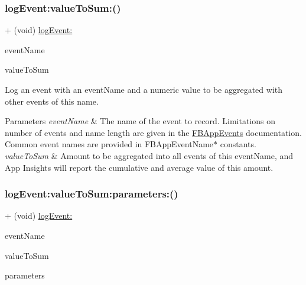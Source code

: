 \subsubsection{\texorpdfstring{log\+Event\+:value\+To\+Sum\+:()}{logEvent:valueToSum:()}\hspace{0.1cm}{\footnotesize\ttfamily [5/5]}}
{\footnotesize\ttfamily + (void) \hyperlink{interfaceFBAppEvents_a816373dd50bcf7381bf8194758ef8441}{log\+Event\+:} \begin{DoxyParamCaption}\item[{(N\+S\+String $\ast$)}]{event\+Name }\item[{valueToSum:(double)}]{value\+To\+Sum }\end{DoxyParamCaption}}

Log an event with an event\+Name and a numeric value to be aggregated with other events of this name.


\begin{DoxyParams}{Parameters}
{\em event\+Name} & The name of the event to record. Limitations on number of events and name length are given in the {\ttfamily \hyperlink{interfaceFBAppEvents}{F\+B\+App\+Events}} documentation. Common event names are provided in {\ttfamily F\+B\+App\+Event\+Name$\ast$} constants.\\
\hline
{\em value\+To\+Sum} & Amount to be aggregated into all events of this event\+Name, and App Insights will report the cumulative and average value of this amount. \\
\hline
\end{DoxyParams}
\mbox{\label{interfaceFBAppEvents_a97a4a0a626b52abef16bdb3ea046b89e}} 
\subsubsection{\texorpdfstring{log\+Event\+:value\+To\+Sum\+:parameters\+:()}{logEvent:valueToSum:parameters:()}\hspace{0.1cm}{\footnotesize\ttfamily [1/5]}}
{\footnotesize\ttfamily + (void) \hyperlink{interfaceFBAppEvents_a816373dd50bcf7381bf8194758ef8441}{log\+Event\+:} \begin{DoxyParamCaption}\item[{(N\+S\+String $\ast$)}]{event\+Name }\item[{valueToSum:(double)}]{value\+To\+Sum }\item[{parameters:(N\+S\+Dictionary $\ast$)}]{parameters }\end{DoxyParamCaption}}

